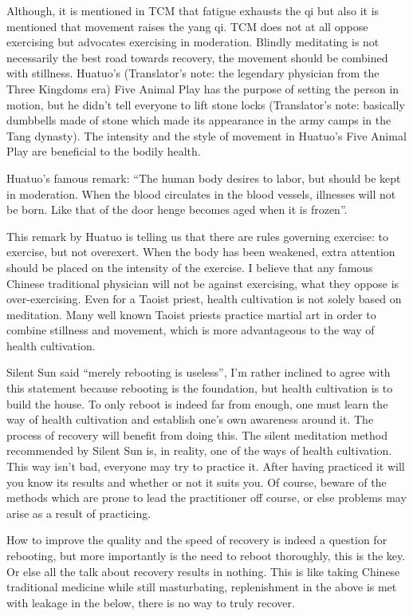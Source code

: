 \documentclass[
]{book}
\begin{document}
Although, it is mentioned in TCM that fatigue exhausts the qi but also it is mentioned that movement raises the yang qi. TCM does not at all oppose exercising but advocates exercising in moderation. Blindly meditating is not necessarily the best road towards recovery, the movement should be combined with stillness. Huatuo's (Translator's note: the legendary physician from the Three Kingdoms era) Five Animal Play has the purpose of setting the person in motion, but he didn't tell everyone to lift stone locks (Translator's note: basically dumbbells made of stone which made its appearance in the army camps in the Tang dynasty). The intensity and the style of movement in Huatuo's Five Animal Play are beneficial to the bodily health.

Huatuo's famous remark: ``The human body desires to labor, but should be kept in moderation. When the blood circulates in the blood vessels, illnesses will not be born. Like that of the door henge becomes aged when it is frozen''.

This remark by Huatuo is telling us that there are rules governing exercise: to exercise, but not overexert. When the body has been weakened, extra attention should be placed on the intensity of the exercise. I believe that any famous Chinese traditional physician will not be against exercising, what they oppose is over-exercising. Even for a Taoist priest, health cultivation is not solely based on meditation. Many well known Taoist priests practice martial art in order to combine stillness and movement, which is more advantageous to the way of health cultivation.

Silent Sun said ``merely rebooting is useless'', I'm rather inclined to agree with this statement because rebooting is the foundation, but health cultivation is to build the house. To only reboot is indeed far from enough, one must learn the way of health cultivation and establish one's own awareness around it. The process of recovery will benefit from doing this. The silent meditation method recommended by Silent Sun is, in reality, one of the ways of health cultivation. This way isn't bad, everyone may try to practice it. After having practiced it will you know its results and whether or not it suits you. Of course, beware of the methods which are prone to lead the practitioner off course, or else problems may arise as a result of practicing.

How to improve the quality and the speed of recovery is indeed a question for rebooting, but more importantly is the need to reboot thoroughly, this is the key. Or else all the talk about recovery results in nothing. This is like taking Chinese traditional medicine while still masturbating, replenishment in the above is met with leakage in the below, there is no way to truly recover.
\end{document}
